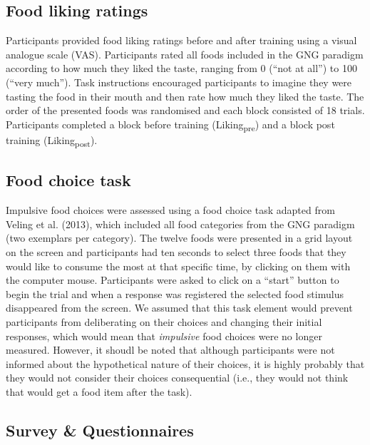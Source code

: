 \documentclass[man,floatsintext]{apa6}
\begin{document}
\hypertarget{food_ratings}{%
\subsection{Food liking ratings}\label{food_ratings}}

\par

Participants provided food liking ratings before and after training using a visual analogue scale (VAS). Participants rated all foods included in the GNG paradigm according to how much they liked the taste, ranging from 0 (\enquote{not at all}) to 100 (\enquote{very much}). Task instructions encouraged participants to imagine they were tasting the food in their mouth and then rate how much they liked the taste. The order of the presented foods was randomised and each block consisted of 18 trials. Participants completed a block before training (Liking\textsubscript{pre}) and a block post training (Liking\textsubscript{post}).

\hypertarget{food_choice}{%
\subsection{Food choice task}\label{food_choice}}

Impulsive food choices were assessed using a food choice task adapted from Veling et al. (2013), which included all food categories from the GNG paradigm (two exemplars per category). The twelve foods were presented in a grid layout on the screen and participants had ten seconds to select three foods that they would like to consume the most at that specific time, by clicking on them with the computer mouse. Participants were asked to click on a \enquote{start} button to begin the trial and when a response was registered the selected food stimulus disappeared from the screen. We assumed that this task element would prevent participants from deliberating on their choices and changing their initial responses, which would mean that \textit{impulsive} food choices were no longer measured. However, it shoudl be noted that although participants were not informed about the hypothetical nature of their choices, it is highly probably that they would not consider their choices consequential (i.e., they would not think that would get a food item after the task).

\hypertarget{survey_questionnaires}{%
\subsection{Survey \& Questionnaires}\label{survey_questionnaires}}
\end{document}
